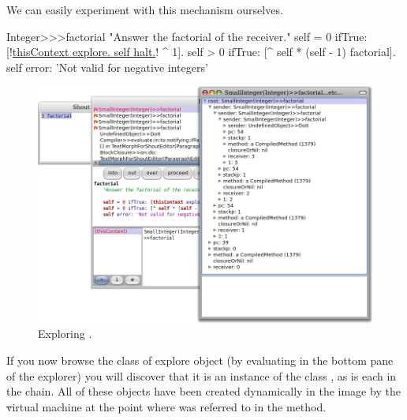 \documentclass[a4paper,10pt,twoside]{book}
\begin{document}
We can easily experiment with this mechanism ourselves.


\begin{code}{}
Integer>>>factorial
	"Answer the factorial of the receiver."
	self = 0 ifTrue: [!\underline{thisContext explore. self halt.}! ^ 1].
	self > 0 ifTrue: [^ self * (self - 1) factorial].
	self error: 'Not valid for negative integers'
\end{code}


\begin{figure}[ht]\centering
	\includegraphics[width=\linewidth]{exploringThisContext}
	\caption{Exploring .\label{fig:exploringThisContext}}
\end{figure}

If you now browse the class of explore object (\ie by evaluating  in the bottom pane of the explorer) you will discover that it is an instance of the class , as is each  in the chain. All of these objects have been created dynamically in the image by the \st virtual machine at the point where  was referred to in the  method.


\end{document}
